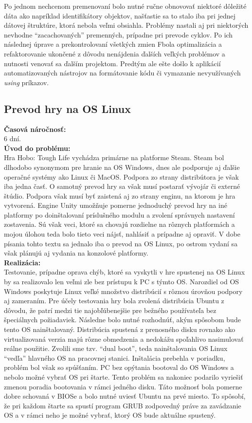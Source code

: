 \documentclass[slovak, bachelorpractice]{diploma}
\begin{document}
Po jednom nechcenom premenovaní bolo nutné ručne obnovovať niektoré dôležité dáta ako napríklad identifikátory objektov, našťastie sa to stalo iba pri jednej dátovej štruktúre, ktorá nebola veľmi obsiahla. Problémy nastali aj pri niektorých nevhodne \enquote{zacachovaných} premenných, prípadne pri prevode cyklov. Po ich následnej úprave a prekontrolovaní všetkých zmien Fbola optimalizácia a refaktorovanie ukončené z dôvodu nenájdenia ďalších veľkých problémov a nutnosti venovať sa ďalším projektom. Predtým ale ešte došlo k aplikácií automatizovaných nástrojov na formátovanie kódu či vymazanie nevyužívaných \textit{using} príkazov.

\subsection{Prevod hry na OS Linux}
\label{sec:linux}
\textbf{Časová náročnosť:} \\ 6 dní.\\
\textbf{Úvod do problému:} \\ Hra Hobo: Tough Life vychádza primárne na platforme Steam. Steam bol dlhodobo synonymom pre hranie na OS Windows, dnes ale podporuje aj ďalšie operačné systémy ako Linux či MacOS. Podpora zo strany distribútora je však iba jedna časť. O samotný prevod hry sa však musí  postarať vývojár či externé štúdio. Podpora však musí byť zaistená aj zo strany enginu, na ktorom je hra vytvorená. Engine Unity umožňuje pomerne jednoduchý prevod hry na iné platformy po doinštalovaní príslušného modulu a zvolení správnych nastavení zostavenia. Sú však veci, ktoré sa chovajú rozdielne na rôznych platformách a mojou úlohou teda bolo tieto veci nájsť, nahlásiť a prípadne aj opraviť. V dobe písania tohto textu sa jednalo iba o prevod na OS Linux, po ostrom vydaní sa však plánujú aj vydania na konzolové platformy.\\
\textbf{Realizácia:} \\ Testovanie, prípadne oprava chýb, ktoré sa vyskytli v hre spustenej na OS Linux by sa realizovalo len veľmi zle bez prístupu k PC s týmto OS. Narozdiel od OS Windows poskytuje Linux veľké množstvo distribúcií s rôznou úrovňou podpory aj zameraním. Pre účely testovania hry bola zvolená distribúcia Ubuntu z dôvodu, že patrí medzi tie najobľúbenejšie pre bežného používateľa bez špeciálnych požiadaviek. Následne bolo nutné rozhodnúť, akým spôsobom bude tento OS nainštalovaný. Distribúcia spustená z prenosného disku rovnako ako virtualizovaná verzia majú rôzne obmedzenia a nedokážu spoľahlivo nasimulovať reálne použitie. Zvolili sme tzv. \enquote{dual boot}, teda nainštalovania OS Linux \enquote{vedľa} hlavného OS na pracovnej stanici. Inštalácia prebehla v poriadku, problém bol však so spúšťaním. PC bez opýtania bootoval do OS Windows a nebolo možné vybrať OS pri štarte. Tento problém sa nakoniec podarilo vyriešiť zmenou poradia bootovania v rámci jedného disku. Táto možnosť bola pomerne dobre schovaná v BIOSe a bolo nutné uviesť Ubuntu na prvé miesto. To spôsobí, že pri každom štarte sa spustí program GRUB zodpovedný práve za zavádzanie OS a v rámci neho je možné vybrať, ktorý OS bude aktuálne spustený.
\end{document}
